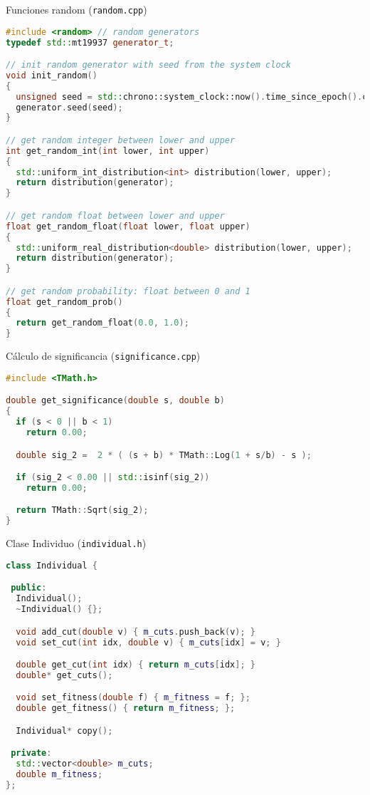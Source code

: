 \documentclass[center,10pt,cm]{beamer}
\begin{document}
\begin{frame}[fragile]{Funciones random (\texttt{random.cpp})}

  \begin{lstlisting}[language=c++]
#include <random> // random generators
typedef std::mt19937 generator_t;

// init random generator with seed from the system clock
void init_random()
{
  unsigned seed = std::chrono::system_clock::now().time_since_epoch().count();
  generator.seed(seed);
}

// get random integer between lower and upper
int get_random_int(int lower, int upper)
{
  std::uniform_int_distribution<int> distribution(lower, upper);
  return distribution(generator);
}

// get random float between lower and upper
float get_random_float(float lower, float upper)
{
  std::uniform_real_distribution<double> distribution(lower, upper);
  return distribution(generator);
}

// get random probability: float between 0 and 1
float get_random_prob()
{
  return get_random_float(0.0, 1.0);
}
  \end{lstlisting}

\end{frame}

\begin{frame}[fragile]{C\'alculo de significancia (\texttt{significance.cpp}) }

  \begin{lstlisting}[language=c++]
#include <TMath.h>

double get_significance(double s, double b)
{
  if (s < 0 || b < 1)
    return 0.00;

  double sig_2 =  2 * ( (s + b) * TMath::Log(1 + s/b) - s );

  if (sig_2 < 0.00 || std::isinf(sig_2))
    return 0.00;

  return TMath::Sqrt(sig_2);
}
  \end{lstlisting}

\end{frame}

\begin{frame}[fragile]{Clase Individuo (\texttt{individual.h})}

  \begin{lstlisting}[language=c++]
class Individual {

 public:
  Individual();
  ~Individual() {};

  void add_cut(double v) { m_cuts.push_back(v); }
  void set_cut(int idx, double v) { m_cuts[idx] = v; }

  double get_cut(int idx) { return m_cuts[idx]; }
  double* get_cuts();

  void set_fitness(double f) { m_fitness = f; };
  double get_fitness() { return m_fitness; };

  Individual* copy();

 private:
  std::vector<double> m_cuts;
  double m_fitness;
};
  \end{lstlisting}

\end{frame}
\end{document}
